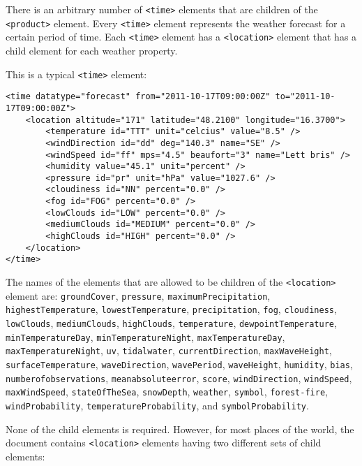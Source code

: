 There is an arbitrary number of \texttt{<time>} elements that are children of the \texttt{<product>} element. Every \texttt{<time>} element represents the weather forecast for a certain period of time. Each \texttt{<time>} element has a \texttt{<location>} element that has a child element for each weather property.

This is a typical \texttt{<time>} element:

\begin{lstlisting}
<time datatype="forecast" from="2011-10-17T09:00:00Z" to="2011-10-17T09:00:00Z">
	<location altitude="171" latitude="48.2100" longitude="16.3700">
		<temperature id="TTT" unit="celcius" value="8.5" />
		<windDirection id="dd" deg="140.3" name="SE" />
		<windSpeed id="ff" mps="4.5" beaufort="3" name="Lett bris" />
		<humidity value="45.1" unit="percent" />
		<pressure id="pr" unit="hPa" value="1027.6" />
		<cloudiness id="NN" percent="0.0" />
		<fog id="FOG" percent="0.0" />
		<lowClouds id="LOW" percent="0.0" />
		<mediumClouds id="MEDIUM" percent="0.0" />
		<highClouds id="HIGH" percent="0.0" />
	</location>
</time>
\end{lstlisting}

The names of the elements that are allowed to be children of the \texttt{<location>} element are: \texttt{groundCover}, \texttt{pressure}, \texttt{maximumPrecipitation}, \texttt{highestTemperature}, \texttt{lowestTemperature}, \texttt{precipitation}, \texttt{fog}, \texttt{cloudiness}, \texttt{lowClouds}, \texttt{mediumClouds}, \texttt{highClouds}, \texttt{temperature}, \texttt{dewpointTemperature}, \texttt{minTemperatureDay}, \texttt{minTemperatureNight}, \texttt{maxTemperatureDay}, \texttt{maxTemperatureNight}, \texttt{uv}, \texttt{tidalwater}, \texttt{currentDirection}, \texttt{maxWaveHeight}, \texttt{surfaceTemperature}, \texttt{waveDirection}, \texttt{wavePeriod}, \texttt{waveHeight}, \texttt{humidity}, \texttt{bias}, \texttt{numberofobservations}, \texttt{meanabsoluteerror}, \texttt{score}, \texttt{windDirection}, \texttt{windSpeed}, \texttt{maxWindSpeed}, \texttt{stateOfTheSea}, \texttt{snowDepth}, \texttt{weather}, \texttt{symbol}, \texttt{forest-fire}, \texttt{windProbability}, \texttt{temperatureProbability}, and \texttt{symbolProbability}.

None of the child elements is required. However, for most places of the world, the  document contains \texttt{<location>} elements having two different sets of child elements:

